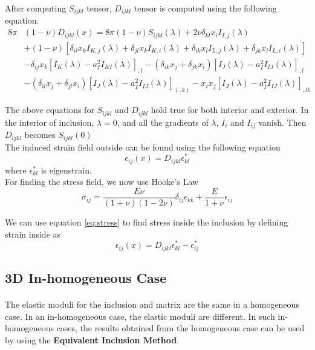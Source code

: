 \documentclass[12pt, a4paper]{report}
\begin{document}
After computing $S_{ijkl}$ tensor, $D_{ijkl}$ tensor is computed using the following equation.
\begin{align}
    8\pi&(1-\nu)D_{ijkl}(x) = 8\pi(1-\nu)S_{ijkl}(\lambda) + 2\nu\delta_{kl}x_{i}I_{I,j}(\lambda) \nonumber \\
    &+(1-\nu)\left[\delta_{il}x_{k}I_{K,j}(\lambda) + \delta_{jl}x_{k}I_{K,i}(\lambda) + \delta_{ik}x_{l}I_{L,j}(\lambda) + \delta_{jk}x_{l}I_{L,i}(\lambda)\right] \nonumber \\
    &-\delta_{ij}x_{k}\left[I_{K}(\lambda) -a_{I}^{2}I_{KI}(\lambda)\right]_{,l} - \left(\delta_{ik}x_{j} + \delta_{jk}x_{i}\right)\left[I_{J}(\lambda) - a_{I}^{2}I_{IJ}(\lambda)\right]_{,l} \nonumber \\
    &-\left(\delta_{il}x_{j} + \delta_{jl}x_{i}\right)\left[I_{J}(\lambda) - a_{I}^{2}I_{IJ}(\lambda) \right]_(,k) - x_{i}x_{j}\left[I_{J}(\lambda) - a_{I}^{2}I_{IJ}(\lambda)\right]_{,lk}
\end{align}

The above equations for $S_{ijkl}$ and $D_{ijkl}$ hold true for both interior and exterior. In the interior of inclusion, $\lambda = 0$, and all the gradients of $\lambda$, $I_i$ and $I_{ij}$ vanish. Then $D_{ijkl}$ becomes $S_{ijkl}(0)$ \\

The induced strain field outside can be found using the following equation
\begin{equation}
    \epsilon_{ij}(x) = D_{ijkl}\epsilon_{kl}^{*}
    \label{eq:epsilon}
\end{equation}
where $\epsilon_{kl}^{*}$ is eigenstrain. \\

For finding the stress field, we now use Hooke's Law
\begin{equation}
    \sigma_{ij} = \frac{E\nu}{(1+\nu)(1-2\nu)}\delta_{ij}\epsilon_{kk} + \frac{E}{1+\nu}\epsilon_{ij}
    \label{eq:stress}
\end{equation}

We can use equation \ref{eq:stress} to find stress inside the inclusion by defining strain inside as
\begin{equation}
    \epsilon_{ij}(x) = D_{ijkl}\epsilon_{kl}^{*} - \epsilon_{ij}^{*}
\end{equation}

\subsection{3D In-homogeneous Case}
\paragraph{}
The elastic moduli for the inclusion and matrix are the same in a homogeneous case. In an in-homogeneous case, the elastic moduli are different. In such in-homogeneous cases, the results obtained from the homogeneous case can be used by using the \textbf{Equivalent Inclusion Method}.\\
\end{document}

